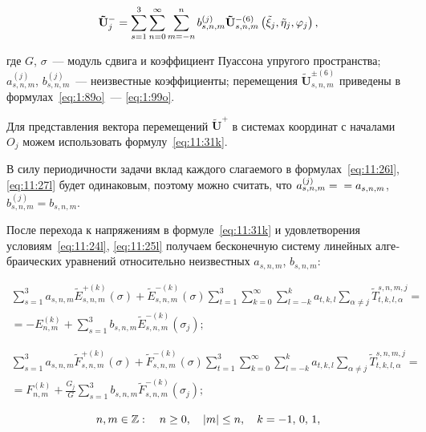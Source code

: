 \begin{russian}
\begin{equation}
\mathbf{\tilde U}_j^- = {\sum\limits_{s = 1}^3 {\sum\limits_{n = 0}^\infty  {\sum\limits_{m=-n}^{n} {b_{s,n,m}^{(j)}} } } } {\bf{\tilde U}}_{s,n,m}^{ - (6)}\left( {{\tilde\xi_j},{\tilde\eta _j},{\varphi _j}} \right),
\label{eq:11:27l}
\end{equation}

\noindent где $G$, $\sigma$~--- модуль сдвига и коэффициент Пуассона упругого пространства; $a_{s,n,m}^{(j)}$, $b_{s,n,m}^{(j)}$~--- неизвестные коэффициенты; перемещения $\mathbf{\tilde U}_{s,n,m}^{\pm(6)}$ приведены в формулах~\eqref{eq:1:89o}~--- \eqref{eq:1:99o}.

Для представления вектора перемещений $\mathbf{\tilde U}^+$ в системах координат с началами $O_j$ можем использовать формулу~\eqref{eq:11:31k}.

В силу периодичности задачи вклад каждого слагаемого в формулах~\eqref{eq:11:26l}, \eqref{eq:11:27l} будет одинаковым, поэтому можно считать, что $a_{s,n,m}^{(j)}=\\=a_{s,n,m}$, $b_{s,n,m}^{(j)}=b_{s,n,m}$.

После перехода к напряжениям в формуле~\eqref{eq:11:31k} и удовлетворения условиям~\eqref{eq:11:24l}, \eqref{eq:11:25l} получаем бесконечную систему линейных алгебраических уравнений относительно неизвестных $a_{s,n,m}$, $b_{s,n,m}$:

\begin{multline}
\sum\limits_{s=1}^3 a_{s,n,m}\tilde E_{s,n,m}^{+(k)}(\sigma)+\tilde E_{s,n,m}^{-(k)}(\sigma)\sum\limits_{t=1}^3\sum\limits_{k=0}^\infty\sum\limits_{l=-k}^k a_{t,k,l}\sum\limits_{\alpha\neq j}\tilde T_{t,k,l,\alpha}^{s,n,m,j}= \\
=-E_{n,m}^{(k)}+\sum\limits_{s=1}^3 b_{s,n,m}\tilde E_{s,n,m}^{-(k)}(\sigma_j);
\label{eq:11:28l}
\end{multline}

\begin{multline}
\sum\limits_{s=1}^3 a_{s,n,m}\tilde F_{s,n,m}^{+(k)}(\sigma)+\tilde F_{s,n,m}^{-(k)}(\sigma)\sum\limits_{t=1}^3\sum\limits_{k=0}^\infty\sum\limits_{l=-k}^k a_{t,k,l}\sum\limits_{\alpha\neq j}\tilde T_{t,k,l,\alpha}^{s,n,m,j}= \\
=F_{n,m}^{(k)}+\frac{G_j}{G}\sum\limits_{s=1}^3 b_{s,n,m}\tilde F_{s,n,m}^{-(k)}(\sigma_j);
\label{eq:11:29l}
\end{multline}

\begin{equation}
n,m \in\mathbb{Z} :\quad n \ge 0,\quad |m| \le n,\quad k =  - 1,{\mkern 1mu} {\kern 1pt} 0,{\mkern 1mu} {\kern 1pt} 1,
\end{equation}


\end{russian}
